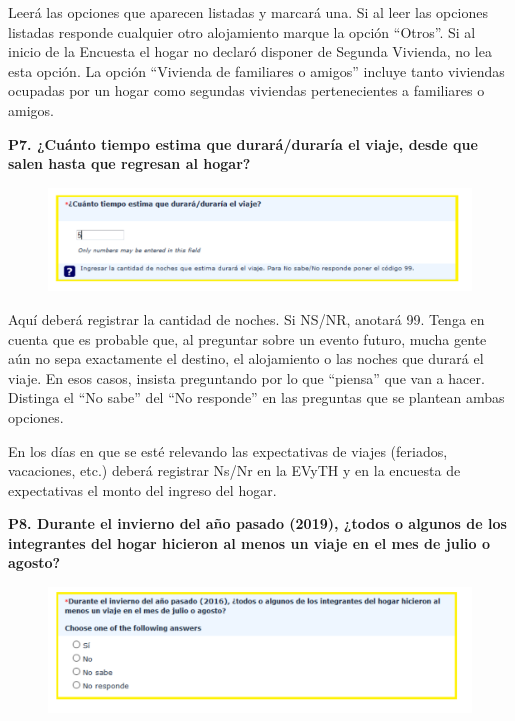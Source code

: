 \documentclass[
  openany]{book}
\begin{document}
Leerá las opciones que aparecen listadas y marcará una. Si al leer las opciones listadas responde cualquier otro alojamiento marque la opción ``Otros''. Si al inicio de la Encuesta el hogar no declaró disponer de Segunda Vivienda, no lea esta opción. La opción ``Vivienda de familiares o amigos'' incluye tanto viviendas ocupadas por un hogar como segundas viviendas pertenecientes a familiares o amigos.

\textbf{P7. ¿Cuánto tiempo estima que durará/duraría el viaje, desde que salen hasta que regresan al hogar?}

\begin{figure}

{\centering \includegraphics[width=1\linewidth]{imagenes/figura6-134} 

}

\end{figure}

Aquí deberá registrar la cantidad de noches. Si NS/NR, anotará 99. Tenga en cuenta que es probable que, al preguntar sobre un evento futuro, mucha gente aún no sepa exactamente el destino, el alojamiento o las noches que durará el viaje. En esos casos, insista preguntando por lo que ``piensa'' que van a hacer. Distinga el ``No sabe'' del ``No responde'' en las preguntas que se plantean ambas opciones.

En los días en que se esté relevando las expectativas de viajes (feriados, vacaciones, etc.) deberá registrar Ns/Nr en la EVyTH y en la encuesta de expectativas el monto del ingreso del hogar.

\textbf{P8. Durante el invierno del año pasado (2019), ¿todos o algunos de los integrantes del hogar hicieron al menos un viaje en el mes de julio o agosto?}

\begin{figure}

{\centering \includegraphics[width=1\linewidth]{imagenes/figura6-135} 

}

\end{figure}
\end{document}
